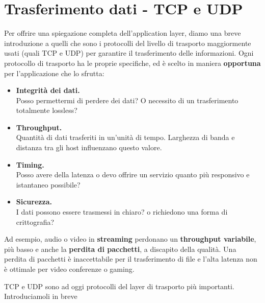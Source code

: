 \section{Trasferimento dati - TCP e UDP}
Per offrire una spiegazione completa dell'application layer, diamo una breve introduzione a quelli che sono i protocolli del livello di trasporto maggiormente usati (quali TCP e UDP) per garantire il trasferimento delle informazioni. Ogni protocollo di trasporto ha le proprie specifiche, ed è scelto in maniera \textbf{opportuna} per l'applicazione che lo sfrutta:
\begin{itemize}
    \item \textbf{Integrità dei dati.}\\
    Posso permettermi di perdere dei dati? O necessito di un trasferimento totalmente lossless?
    \item \textbf{Throughput.}\\
    Quantità di dati trasferiti in un'unità di tempo. Larghezza di banda e distanza tra gli host influenzano questo valore.
    \item \textbf{Timing.}\\
    Posso avere della latenza o devo offrire un servizio quanto più responsivo e istantaneo possibile?
    \item \textbf{Sicurezza.}\\
    I dati possono essere trasmessi in chiaro? o richiedono una forma di crittografia?
\end{itemize}
Ad esempio, audio o video in \textbf{streaming} perdonano un \textbf{throughput variabile}, più basso e anche la \textbf{perdita di pacchetti}, a discapito della qualità. Una perdita di pacchetti è inaccettabile per il trasferimento di file e l'alta latenza non è ottimale per video conferenze o gaming.

TCP e UDP sono ad oggi protocolli del layer di trasporto più importanti. Introduciamoli in breve 

